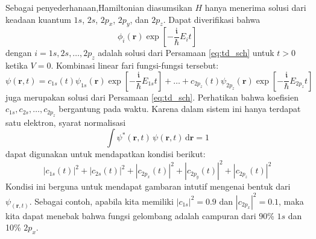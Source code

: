 \documentclass[a4paper,bahasa]{paper}
\renewcommand{\imath}{\mathfrak{i}}
\begin{document}
Sebagai penyederhanaan,Hamiltonian diasumsikan $H$ hanya menerima solusi dari
keadaan kuantum $1s$, $2s$, $2p_{x}$, $2p_{y}$, dan $2p_{z}$.
Dapat diverifikasi bahwa
%
\begin{equation}
\phi_{i}(\mathbf{r})\exp\left[ -\frac{\imath}{\hbar} E_{i}t \right]
\end{equation}
%
dengan $i = 1s, 2s, \ldots, 2p_{z}$ adalah solusi dari Persamaan \eqref{eq:td_sch}
untuk $t > 0$ ketika $V = 0$.
Kombinasi linear fari fungsi-fungsi tersebut:
%
\begin{equation}
\psi(\mathbf{r},t) =
c_{1s}(t) \psi_{1s}(\mathbf{r}) \exp\left[-\frac{\imath}{\hbar} E_{1s}t\right]
+ \ldots +
c_{2p_{z}}(t) \psi_{2p_{z}}(\mathbf{r}) \exp\left[-\frac{\imath}{\hbar} E_{2p_{z}}t\right]
\label{eq:psi_komb_lin}
\end{equation}
%
juga merupakan solusi dari Persamaan \eqref{eq:td_sch}.
Perhatikan bahwa koefisien $c_{1s}, c_{2s}, \ldots, c_{2p_{z}}$ bergantung pada waktu.
%
Karena dalam sistem ini hanya terdapat satu elektron, syarat normalisasi
\begin{equation}
\int \psi^{*}(\mathbf{r},t)\,\psi(\mathbf{r},t)\,\mathrm{d}\mathbf{r} = 1
\end{equation}
dapat digunakan untuk mendapatkan kondisi berikut:
\begin{equation}
\left| c_{1s}(t) \right|^2 + \left| c_{2s}(t) \right|^2 +
\left| c_{2p_{x}}(t) \right|^2 + \left| c_{2p_{y}}(t) \right|^2 +
\left| c_{2p_{z}}(t) \right|^2
\end{equation}
%
Kondisi ini berguna untuk mendapat gambaran intutif mengenai bentuk dari $\psi_(\mathbf{r},t)$.
Sebagai contoh, apabila kita memiliki $\left|c_{1s}\right|^2 = 0.9$ dan 
$\left|c_{2p_{x}}\right|^2 = 0.1$, maka kita dapat menebak bahwa fungsi gelombang adalah
campuran dari 90\% $1s$ dan 10\% $2p_{x}$.
\end{document}
